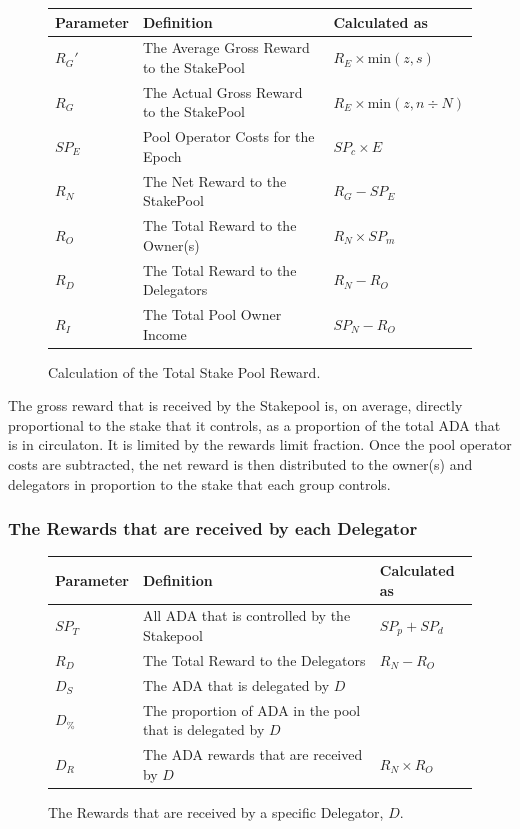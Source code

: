 \documentclass[11pt,a4paper,dvipsnames,twosided]{article}
\newcommand{\ada}{ADA{}}
\begin{document}
\begin{figure}[h!]
\begin{center}
\begin{tabular}{||l|p{6cm}|l||}
  \hline \hline
\textbf{Parameter}  & \textbf{Definition} & \textbf{Calculated as} \\\hline
$R_G'$ & The Average Gross Reward to the StakePool & $R_E \times \textrm{min} (z,s)$ \\\hline
$R_G$ & The Actual Gross Reward to the StakePool & $R_E \times \textrm{min} (z,n \div N)$ \\\hline
$SP_E$ & Pool Operator Costs for the Epoch & $SP_c \times E$ \\\hline
$R_N$  & The Net Reward to the StakePool & $R_G - SP_E$ \\\hline
$R_O$ & The Total Reward to the Owner(s) & $R_N \times SP_m $ \\\hline
$R_D$ & The Total Reward to the Delegators & $R_N - R_O$ \\\hline
$R_I$ & The Total Pool Owner Income & $SP_N - R_O$ \\\hline
\hline
\end{tabular}
\end{center}
\caption{Calculation of the Total Stake Pool Reward.}
\end{figure}

\noindent
The gross reward that is received by the Stakepool is, on average, directly proportional to the
stake that it controls, as a proportion of the total \ada{} that is in circulaton.
It is limited by the rewards limit fraction.  Once the pool operator costs are subtracted,
the net reward is then distributed to the owner(s) and delegators in proportion to the
stake that each group controls.

\subsubsection*{The Rewards that are received by each Delegator}

\begin{figure}[h!]
\begin{center}
\begin{tabular}{||l|p{6cm}|l||}
  \hline \hline
\textbf{Parameter} & \textbf{Definition} & \textbf{Calculated as} \\\hline
$SP_T$ & All \ada{} that is controlled by the Stakepool & $SP_p + SP_d$ \\\hline
$R_D$ & The Total Reward to the Delegators & $R_N - R_O$ \\\hline
$D_S$ & The \ada{} that is delegated by  $D$ & \\\hline
$D_\%$ & The proportion of \ada{} in the pool that is delegated by $D$ & \\\hline
$D_R$ & The \ada{} rewards that are received by $D$ & $R_N \times R_O$ \\\hline
\hline
\end{tabular}
\end{center}
\caption{The Rewards that are received by a specific Delegator, $D$.}
\end{figure}
\end{document}
